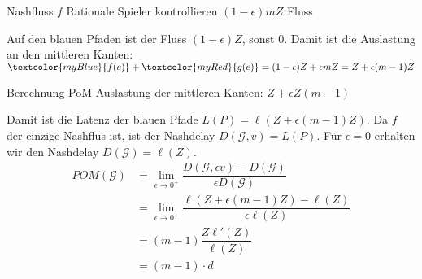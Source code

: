 \documentclass{beamer}
\begin{document}
\begin{frame}{Nashfluss $f$}
	Rationale Spieler kontrollieren $(1- \epsilon)mZ$ Fluss
	\begin{figure}
	\end{figure}
	\pause
	Auf den blauen Pfaden ist der Fluss $(1- \epsilon)Z$, sonst $0$. Damit ist die Auslastung an den mittleren Kanten: $\textcolor{myBlue}{f(e)} + \textcolor{myRed}{g(e)} = (1 - \epsilon)Z + \epsilon m Z = Z + \epsilon (m-1) Z$
\end{frame}

\begin{frame}{Berechnung PoM}
	Auslastung der mittleren Kanten: $Z + \epsilon Z (m-1)$
	
	Damit ist die Latenz der blauen Pfade $L(P) = \ell (Z + \epsilon (m-1) Z)$.
	Da $f$ der einzige Nashflus ist, ist der Nashdelay $D(\mathcal G, v) = L(P)$.
	Für $\epsilon = 0$ erhalten wir den Nashdelay $D(\mathcal G) = \ell(Z)$.
	\begin{align*}
		POM(\mathcal G) &= \lim_{\epsilon \to 0^+} \dfrac{D(\mathcal G, \epsilon v) - D(\mathcal G)}{\epsilon D(\mathcal G)} \\
			&= \lim_{\epsilon \to 0^+} \dfrac{\ell (Z + \epsilon (m-1) Z) - \ell(Z)}{\epsilon \ell(Z)} \\
			&= (m - 1)\dfrac{Z \ell'(Z)}{\ell(Z)} \\
			&= (m - 1) \cdot d
	\end{align*}
\end{frame}
\end{document}
